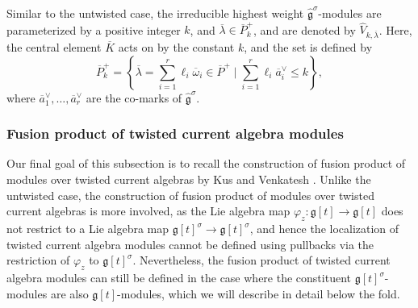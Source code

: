 \documentclass[pdftex]{sigma}
\numberwithin{equation}{section}
\begin{document}
Similar to the untwisted case, the irreducible highest weight $\widehat{\mathfrak{g}}^{\sigma}$-modules are parameterized by a positive integer $k$, and $\overline{\lambda}\in \overline{P}_k^+$, and are denoted by $\widehat{V}_{k,\overline{\lambda}}$. Here, the central element $\overline{K}$ acts on  by the constant $k$, and the set  is defined by
\begin{equation*}
\overline{P}_k^+=\left\{\overline{\lambda}=\sum_{i=1}^r\ell_i\overline{\omega}_i\in \overline{P}^+\mid \sum_{i=1}^r\ell_i\overline{a}_i^{\vee}\leq k\right\},
\end{equation*}
where $\overline{a}_1^{\vee},\dots,\overline{a}_r^{\vee}$ are the co-marks of $\widehat{\mathfrak{g}}^{\sigma}$.

\subsubsection{Fusion product of twisted current algebra modules}\label{Section 2.4.1}

Our final goal of this subsection is to recall the construction of fusion product of modules over twisted current algebras by Kus and Venkatesh \cite{KV16}. Unlike the untwisted case, the construction of fusion product of modules over twisted current algebras is more involved, as the Lie algebra map $\varphi_z\colon\mathfrak{g}[t]\to\mathfrak{g}[t]$ does not restrict to a Lie algebra map $\mathfrak{g}[t]^{\sigma}\to\mathfrak{g}[t]^{\sigma}$, and hence the localization of twisted current algebra modules cannot be defined using pullbacks via the restriction of $\varphi_z$ to $\mathfrak{g}[t]^{\sigma}$. Nevertheless, the fusion product of twisted current algebra modules can still be defined in the case where the constituent $\mathfrak{g}[t]^{\sigma}$-modules are also $\mathfrak{g}[t]$-modules, which we will describe in detail below the fold.
\end{document}
